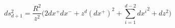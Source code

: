 \begin{equation}
\label{horo2}
ds^2_{d+1}=\frac{R^2}{z^2}\big(2dx^+dx^- +z^{d}(dx^+)^2 +\sum_{i=1}^{d-2}{dx^i}^2+dz^2\big)
\end{equation}

